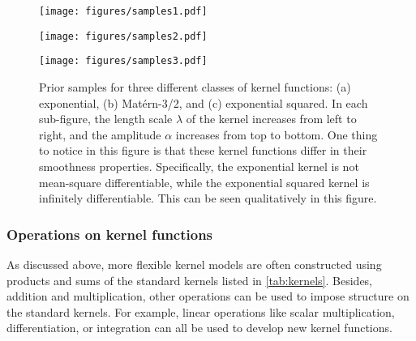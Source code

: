 \documentclass[letterpaper]{ar-1col}
\begin{document}
\begin{figure}[ht]
  \centering
  \begin{minipage}[t]{0.3\linewidth}
    \texttt{[image: figures/samples1.pdf]}
  \end{minipage} \hfill
  \begin{minipage}[t]{0.3\linewidth}
    \texttt{[image: figures/samples2.pdf]}
  \end{minipage} \hfill
  \begin{minipage}[t]{0.3\linewidth}
    \texttt{[image: figures/samples3.pdf]}
  \end{minipage}
  \caption{Prior samples for three different classes of kernel functions: (a) exponential, (b) Mat\'ern-3/2, and (c) exponential squared.
  In each sub-figure, the length scale $\lambda$ of the kernel increases from left to right, and the amplitude $\alpha$ increases from top to bottom.
  One thing to notice in this figure is that these kernel functions differ in their smoothness properties.
  Specifically, the exponential kernel is not mean-square differentiable, while the exponential squared kernel is infinitely differentiable.
  This can be seen qualitatively in this figure.}
  \label{fig:samples}
\end{figure}

\subsubsection{Operations on kernel functions}

As discussed above, more flexible kernel models are often constructed using products and sums of the standard kernels listed in \autoref{tab:kernels}.
Besides, addition and multiplication, other operations can be used to impose structure on the standard kernels.
For example, linear operations like scalar multiplication, differentiation, or integration can all be used to develop new kernel functions.
\end{document}
